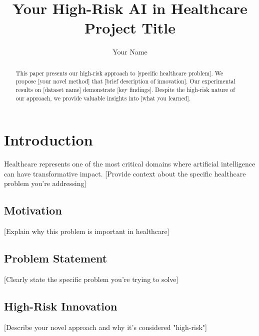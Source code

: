 \documentclass[sigconf]{acmart}
\begin{document}
\title{Your High-Risk AI in Healthcare Project Title}

\author{Your Name}


\begin{abstract}
This paper presents our high-risk approach to [specific healthcare problem]. 
We propose [your novel method] that [brief description of innovation]. 
Our experimental results on [dataset name] demonstrate [key findings]. 
Despite the high-risk nature of our approach, we provide valuable insights into [what you learned].
\end{abstract}

\maketitle

\section{Introduction}
\label{sec:introduction}

Healthcare represents one of the most critical domains where artificial intelligence can have transformative impact. 
[Provide context about the specific healthcare problem you're addressing]

\subsection{Motivation}
[Explain why this problem is important in healthcare]

\subsection{Problem Statement}
[Clearly state the specific problem you're trying to solve]

\subsection{High-Risk Innovation}
[Describe your novel approach and why it's considered "high-risk"]
\end{document}
